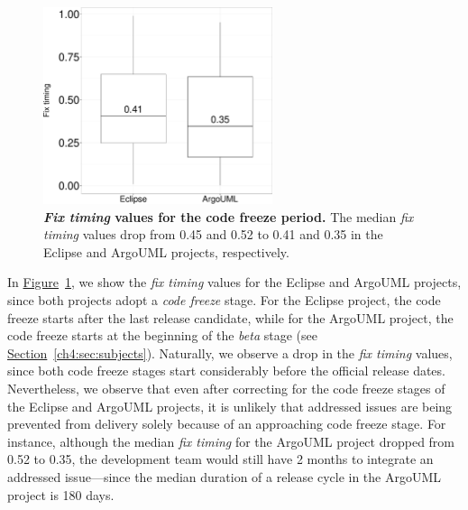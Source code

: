 \begin{figure} \center \includegraphics[width=0.60\textwidth,keepaspectratio]
	{chapters/chapter4/figures/as_codefreeze.pdf} \caption{\textbf{{\em Fix timing} values for
		the code freeze period.} The median {\em fix timing} values drop
		from 0.45 and 0.52 to 0.41 and 0.35 in the Eclipse and ArgoUML
projects, respectively. } \label{ch4:fig:codefreeze_allsystems} \end{figure}

In \hyperref[ch4:fig:codefreeze_allsystems]{Figure}~\ref{ch4:fig:codefreeze_allsystems},
we show the {\em fix timing} values for the Eclipse and ArgoUML projects, since
both projects adopt a {\em code freeze} stage. For the Eclipse project, the code
freeze starts after the last release candidate, while for the ArgoUML project,
the code freeze starts at the beginning of the {\em beta} stage (see
\hyperref[ch4:sec:subjects]{Section}~\ref{ch4:sec:subjects}). Naturally, we observe a
drop in the {\em fix timing} values, since both code freeze stages start considerably
before the official release dates. Nevertheless, we observe that even after correcting for
the code freeze stages of the Eclipse and ArgoUML projects, it is unlikely
that addressed issues are being prevented from delivery solely because of an approaching code
freeze stage. For instance, although the median {\em fix timing} for the ArgoUML project
dropped from 0.52 to 0.35, the development team would still have 2 months to
integrate an addressed issue---since the median duration of a release cycle in the
ArgoUML project is 180 days.


